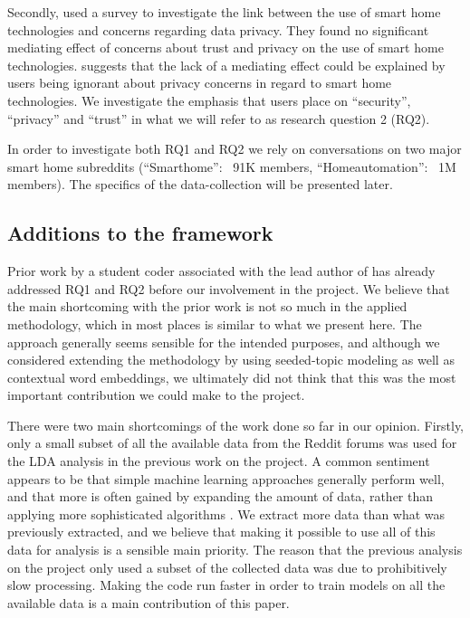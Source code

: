 \documentclass{article}
\begin{document}
Secondly,  used a survey to investigate the link between the use of smart home technologies and concerns regarding data privacy. They found no significant mediating effect of concerns about trust and privacy on the use of smart home technologies.  suggests that the lack of a mediating effect could be explained by users being ignorant about privacy concerns in regard to smart home technologies. We investigate the emphasis that users place on “security”, “privacy” and “trust” in what we will refer to as research question 2 (RQ2). 

In order to investigate both RQ1 and RQ2 we rely on conversations on two major smart home subreddits (“Smarthome”: ~91K members, “Homeautomation”: ~1M members). The specifics of the data-collection will be presented later. 

    \subsection{Additions to the framework}
    Prior work by a student coder associated with the lead author of  has already addressed RQ1 and RQ2 before our involvement in the project. We believe that the main shortcoming with the prior work is not so much in the applied methodology, which in most places is similar to what we present here. The approach generally seems sensible for the intended purposes, and although we considered extending the methodology by using seeded-topic modeling as well as contextual word embeddings, we ultimately did not think that this was the most important contribution we could make to the project. 

There were two main shortcomings of the work done so far in our opinion. Firstly, only a small subset of all the available data from the Reddit forums was used for the LDA analysis in the previous work on the project. A common sentiment appears to be that simple machine learning approaches generally perform well, and that more is often gained by expanding the amount of data, rather than applying more sophisticated algorithms \cite{domingos2012few}. We extract more data than what was previously extracted, and we believe that making it possible to use all of this data for analysis is a sensible main priority. The reason that the previous analysis on the project only used a subset of the collected data was due to prohibitively slow processing. Making the code run faster in order to train models on all the available data is a main contribution of this paper. 
\end{document}
